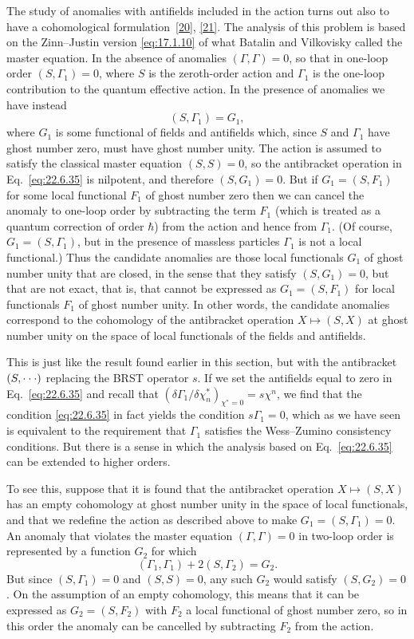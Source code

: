 The study of anomalies with antifields included in the action turns out
also to have a cohomological formulation~\hyperref[ch22-ref-20]{[20]},
\hyperref[ch22-ref-21]{[21]}. The analysis of this problem is based on the
Zinn--Justin version \eqref{eq:17.1.10} of what Batalin and Vilkovisky
called the master equation. In the absence of anomalies
$(\Gamma,\Gamma)=0$, so that in one-loop order $(S,\Gamma_1)=0$, where
$S$ is the zeroth-order action and $\Gamma_1$ is the one-loop contribution
to the quantum effective action. In the presence of anomalies we have
instead
\begin{equation}
 (S,\Gamma_1)=G_1,
 \tag{22.6.35}\label{eq:22.6.35}
\end{equation}
where $G_1$ is some functional of fields and antifields which, since $S$
and $\Gamma_1$ have ghost number zero, must have ghost number unity. The
action is assumed to satisfy the classical master equation $(S,S)=0$, so
the antibracket operation in Eq.~\eqref{eq:22.6.35} is nilpotent, and
therefore $(S,G_1)=0$. But if $G_1=(S,F_1)$ for some local functional
$F_1$ of ghost number zero then we can cancel the anomaly to one-loop
order by subtracting the term $F_1$ (which is treated as a quantum
correction of order $\hbar$) from the action and hence from $\Gamma_1$.
(Of course, $G_1=(S,\Gamma_1)$, but in the presence of massless particles
$\Gamma_1$ is not a local functional.) Thus the candidate anomalies are
those local functionals $G_1$ of ghost number unity that are closed, in
the sense that they satisfy $(S,G_1)=0$, but that are not exact, that is,
that cannot be expressed as $G_1=(S,F_1)$ for local functionals $F_1$ of
ghost number unity. In other words, the candidate anomalies correspond to
the cohomology of the antibracket operation $X\mapsto(S,X)$ at ghost
number unity on the space of local functionals of the fields and
antifields.

This is just like the result found earlier in this section, but with the
antibracket $(S,\mathinner{\cdot\cdot\cdot})$ replacing the BRST operator
$s$. If we set the antifields equal to zero in Eq.~\eqref{eq:22.6.35} and
recall that
$(\delta\Gamma_1/\delta\chi_n^*)_{\chi^*=0}=s\chi^n$, we find that the
condition \eqref{eq:22.6.35} in fact yields the condition
$s\Gamma_1=0$, which as we have seen is equivalent to the requirement that
$\Gamma_1$ satisfies the Wess--Zumino consistency conditions. But there
is a sense in which the analysis based on Eq.~\eqref{eq:22.6.35} can be
extended to higher orders.

To see this, suppose that it is found that the antibracket operation
$X\mapsto(S,X)$ has an empty cohomology at ghost number unity in the space
of local functionals, and that we redefine the action as described above
to make $G_1=(S,\Gamma_1)=0$. An anomaly that violates the master equation
$(\Gamma,\Gamma)=0$ in two-loop order is represented by a function $G_2$
for which
\[
 (\Gamma_1,\Gamma_1)+2(S,\Gamma_2)=G_2.
\]
But since $(S,\Gamma_1)=0$ and $(S,S)=0$, any such $G_2$ would satisfy
$(S,G_2)=0$. On the assumption of an empty cohomology, this means that it
can be expressed as $G_2=(S,F_2)$ with $F_2$ a local functional of ghost
number zero, so in this order the anomaly can be cancelled by subtracting
$F_2$ from the action.

